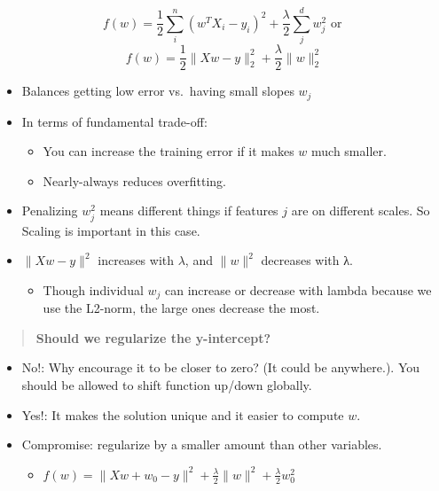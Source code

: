\documentclass[]{article}
\providecommand{\tightlist}{%
  \setlength{\itemsep}{0pt}\setlength{\parskip}{0pt}}
\begin{document}
\[f(w) = \frac{1}{2}\sum_i^n(w^TX_i - y_i)^2 + \frac{\lambda}{2}\sum_j^d w_j^2 \text{ or }\]
\[f(w) = \frac{1}{2}\lVert Xw - y\rVert_2^2 + \frac{\lambda}{2} \lVert w\rVert_2^2\]

\begin{itemize}
\tightlist
\item
  Balances getting low error vs.~having small slopes \(w_j\)
\item
  In terms of fundamental trade-off:

  \begin{itemize}
  \tightlist
  \item
    You can increase the training error if it makes \(w\) much smaller.
  \item
    Nearly-always reduces overfitting.
  \end{itemize}
\item
  Penalizing \(w_j^2\) means different things if features \(j\) are on
  different scales. So Scaling is important in this case.
\item
  \(\lVert Xw - y\rVert^2\) increases with \(\lambda\), and
  \(\lVert w\rVert^2\) decreases with λ.

  \begin{itemize}
  \tightlist
  \item
    Though individual \(w_j\) can increase or decrease with lambda
    because we use the L2-norm, the large ones decrease the most.
  \end{itemize}
\end{itemize}

\begin{quote}
\textbf{Should we regularize the y-intercept?}
\end{quote}

\begin{itemize}
\tightlist
\item
  No!: Why encourage it to be closer to zero? (It could be anywhere.).
  You should be allowed to shift function up/down globally.
\item
  Yes!: It makes the solution unique and it easier to compute \(w\).
\item
  Compromise: regularize by a smaller amount than other variables.

  \begin{itemize}
  \tightlist
  \item
    \(f(w) = \lVert Xw + w_0 - y\rVert^2 + \frac{\lambda}{2}\lVert w\rVert^2 + \frac{\lambda}{2}w_0^2\)
  \end{itemize}
\end{itemize}
\end{document}
